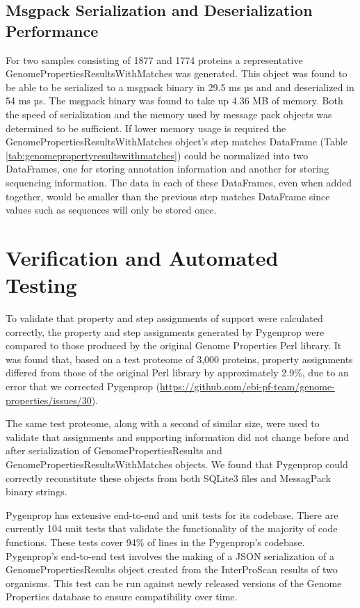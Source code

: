 \subsection{Msgpack Serialization and Deserialization Performance} \label{messagepack-performance}

For two samples consisting of 1877 and 1774 proteins a representative GenomePropertiesResultsWithMatches was generated. This object was found to be able to be serialized to a msgpack binary in 29.5 ms  µs and and deserialized in 54 ms  µs. The msgpack binary was found to take up 4.36 MB of memory. Both the speed of serialization and the memory used by message pack objects was determined to be sufficient. If lower memory usage is required the GenomePropertiesResultsWithMatches object's step matches DataFrame (Table \ref{tab:genomepropertyresultswithmatches}) could be normalized into two DataFrames, one for storing annotation information and another for storing sequencing information. The data in each of these DataFrames, even when added together, would be smaller than the previous step matches DataFrame since values such as sequences will only be stored once.

\section{Verification and Automated Testing}

To validate that property and step assignments of support were calculated correctly, the property and step assignments generated by Pygenprop were compared to those produced by the original Genome Properties Perl library. It was found that, based on a test proteome of 3,000 proteins, property assignments differed from those of the original Perl library by approximately 2.9\%, due to an error that we corrected Pygenprop (\href{https://github.com/ebi-pf-team/genome-properties/issues/30}{https://github.com/ebi-pf-team/genome-properties/issues/30}).

The same test proteome, along with a second of similar size, were used to validate that assignments and supporting information did not change before and after serialization of GenomePropertiesResults and GenomePropertiesResultsWithMatches objects. We found that Pygenprop could correctly reconstitute these objects from both SQLite3 files and MessagPack binary strings.

Pygenprop has extensive end-to-end and unit tests for its codebase. There are currently 104 unit tests that validate the functionality of the majority of code functions. These tests cover 94\% of lines in the Pygenprop's codebase. Pygenprop's end-to-end test involves the making of a JSON serialization of a GenomePropertiesResults object created from the InterProScan results of two organisms. This test can be run against newly released versions of the Genome Properties database to ensure compatibility over time. 

